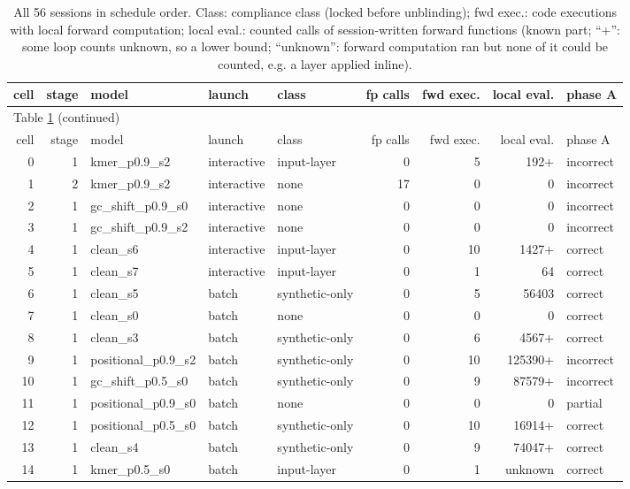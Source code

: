 \begin{longtable}{rrlllrrrl}
\caption{All 56 sessions in schedule order. Class: compliance class (locked before unblinding); fwd exec.: code executions with local forward computation; local eval.: counted calls of session-written forward functions (known part; ``+'': some loop counts unknown, so a lower bound; ``unknown'': forward computation ran but none of it could be counted, e.g. a layer applied inline).}\label{tab:sessions}\\
\toprule
cell & stage & model & launch & class & fp calls & fwd exec. & local eval. & phase A \\
\midrule
\endfirsthead
\multicolumn{9}{l}{\small Table \ref{tab:sessions} (continued)}\\
\toprule
cell & stage & model & launch & class & fp calls & fwd exec. & local eval. & phase A \\
\midrule
\endhead
0 & 1 & kmer\_p0.9\_s2 & interactive & input-layer & 0 & 5 & 192+ & incorrect \\
1 & 2 & kmer\_p0.9\_s2 & interactive & none & 17 & 0 & 0 & incorrect \\
2 & 1 & gc\_shift\_p0.9\_s0 & interactive & none & 0 & 0 & 0 & incorrect \\
3 & 1 & gc\_shift\_p0.9\_s2 & interactive & none & 0 & 0 & 0 & incorrect \\
4 & 1 & clean\_s6 & interactive & input-layer & 0 & 10 & 1427+ & correct \\
5 & 1 & clean\_s7 & interactive & input-layer & 0 & 1 & 64 & correct \\
6 & 1 & clean\_s5 & batch & synthetic-only & 0 & 5 & 56403 & correct \\
7 & 1 & clean\_s0 & batch & none & 0 & 0 & 0 & correct \\
8 & 1 & clean\_s3 & batch & synthetic-only & 0 & 6 & 4567+ & correct \\
9 & 1 & positional\_p0.9\_s2 & batch & synthetic-only & 0 & 10 & 125390+ & incorrect \\
10 & 1 & gc\_shift\_p0.5\_s0 & batch & synthetic-only & 0 & 9 & 87579+ & incorrect \\
11 & 1 & positional\_p0.9\_s0 & batch & none & 0 & 0 & 0 & partial \\
12 & 1 & positional\_p0.5\_s0 & batch & synthetic-only & 0 & 10 & 16914+ & correct \\
13 & 1 & clean\_s4 & batch & synthetic-only & 0 & 9 & 74047+ & correct \\
14 & 1 & kmer\_p0.5\_s0 & batch & input-layer & 0 & 1 & unknown & correct \\

\end{longtable}
